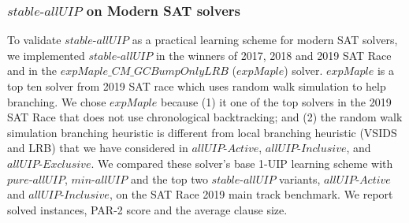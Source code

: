 \documentclass[runningheads]{llncs}
\newcommand{\allUip}{\textit{stable-allUIP}}
\newcommand{\allUipPure}{\textit{pure-allUIP}\xspace}
\newcommand{\allUipMin}{\textit{min-allUIP}\xspace}
\newcommand{\allUipAct}{\textit{allUIP-Active}}
\newcommand{\allUipIn}{\textit{allUIP-Inclusive}}
\newcommand{\allUipEx}{\textit{allUIP-Exclusive}}
\newcommand{\MapleBase}{\textit{MapleCOMSPS\_LRB}}
\newcommand{\expSAT}{\textit{expMaple\_CM\_GCBumpOnlyLRB} }
\newcommand{\expSATShort}{\textit{expMaple} }
\begin{document}




\subsubsection{$\allUip$ on Modern SAT solvers}
To validate $\allUip$ as a practical learning scheme for modern SAT
solvers, we implemented $\allUip$ in the winners of 2017, 2018 and
2019 SAT
Race\cite{DBLP:conf/ijcai/LuoLXML17,ryvchin2018maple,Stepan2019MapleLCMDistChronoBT}
and in the $\expSAT$\cite{MdSolimul2019expMalpe} ($\expSATShort$)
solver. $\expSATShort$ is a top ten solver from 2019 SAT race which
uses random walk simulation to help branching. We chose $\expSATShort$
because (1) it one of the top solvers in the 2019 SAT Race that does
not use chronological backtracking; and (2) the random walk simulation
branching heuristic is different from local branching heuristic (VSIDS
and LRB) that we have considered in $\allUipAct$, $\allUipIn$, and
$\allUipEx$. We compared these solver's base 1-UIP learning scheme
with $\allUipPure$, $\allUipMin$ and the top two $\allUip$ variants,
$\allUipAct$ and $\allUipIn$, on the SAT Race 2019 main track
benchmark. We report solved instances, PAR-2 score and the average
clause size.
\end{document}
